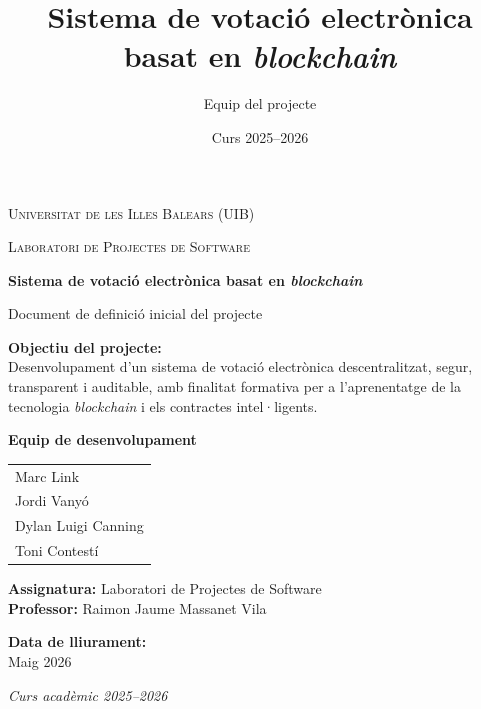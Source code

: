 \documentclass[12pt,a4paper]{article}
\title{Sistema de votació electrònica basat en \textit{blockchain}}
\author{Equip del projecte}
\date{Curs 2025--2026}
\begin{document}
\begin{titlepage}
    \centering
    

    {\scshape\LARGE Universitat de les Illes Balears (UIB)\par}
    \vspace{0.5cm}
    {\scshape\Large Laboratori de Projectes de Software\par}
    \vspace{2cm}

    {\huge\bfseries Sistema de votació electrònica basat en \textit{blockchain}\par}
    \vspace{0.5cm}
    {\Large Document de definició inicial del projecte\par}
    
    \vspace{2cm}

    \textbf{Objectiu del projecte:}\\
    Desenvolupament d'un sistema de votació electrònica descentralitzat,
    segur, transparent i auditable, amb finalitat formativa per a l'aprenentatge
    de la tecnologia \textit{blockchain} i els contractes intel·ligents.
    
    \vfill

    \textbf{Equip de desenvolupament}\par
    \vspace{0.3cm}
    \begin{tabular}{l}
        Marc Link \\
        Jordi Vanyó \\
        Dylan Luigi Canning \\
        Toni Contestí \\
    \end{tabular}

    \vspace{1.5cm}

    \textbf{Assignatura:} Laboratori de Projectes de Software\\
    \textbf{Professor:} Raimon Jaume Massanet Vila

    \vspace{1cm}

    \textbf{Data de lliurament:} \\ Maig 2026

    \vfill

    \textit{Curs acadèmic 2025–2026}

\end{titlepage}
\end{document}
